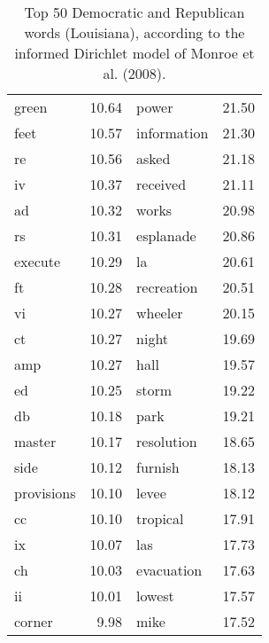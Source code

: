 \begin{table}[ht]
\begin{tabular}{lrlr}
  green & 10.64 & power & 21.50 \\ 
  feet & 10.57 & information & 21.30 \\ 
  re & 10.56 & asked & 21.18 \\ 
  iv & 10.37 & received & 21.11 \\ 
  ad & 10.32 & works & 20.98 \\ 
  rs & 10.31 & esplanade & 20.86 \\ 
  execute & 10.29 & la & 20.61 \\ 
  ft & 10.28 & recreation & 20.51 \\ 
  vi & 10.27 & wheeler & 20.15 \\ 
  ct & 10.27 & night & 19.69 \\ 
  amp & 10.27 & hall & 19.57 \\ 
  ed & 10.25 & storm & 19.22 \\ 
  db & 10.18 & park & 19.21 \\ 
  master & 10.17 & resolution & 18.65 \\ 
  side & 10.12 & furnish & 18.13 \\ 
  provisions & 10.10 & levee & 18.12 \\ 
  cc & 10.10 & tropical & 17.91 \\ 
  ix & 10.07 & las & 17.73 \\ 
  ch & 10.03 & evacuation & 17.63 \\ 
  ii & 10.01 & lowest & 17.57 \\ 
  corner & 9.98 & mike & 17.52 \\ 
   \hline
\end{tabular}
\endgroup
\caption{Top 50 Democratic and Republican words (Louisiana), according to the informed Dirichlet model of Monroe et al. (2008).} 
\label{tabFightinLA}
\end{table}

